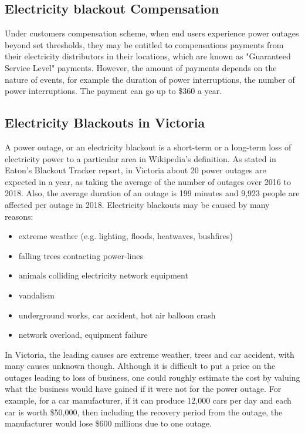\documentclass[12pt]{article}
\begin{document}
\subsection{Electricity blackout Compensation}
\begin{flushleft}
Under customers compensation scheme, when end users experience power outages beyond set thresholds, they may be entitled to compensations payments from their electricity distributors in their locations, which are known as "Guaranteed Service Level" payments. However, the amount of payments depends on the nature of events, for example the duration of power interruptions, the number of power interruptions. The payment can go up to \$360 a year.\parencite{cc} \par 
\end{flushleft}

\subsection{Electricity Blackouts in Victoria}
\begin{flushleft}
A power outage, or an electricity blackout is a short-term or a long-term loss of electricity power to a particular area in Wikipedia's definition. As stated in Eaton's Blackout Tracker report, in Victoria about 20 power outages are expected in a year, as taking the average of the number of outages over 2016 to 2018. Also, the average duration of an outage is 199 minutes and 9,923 people are affected per outage in 2018.\parencite{Eaton} Electricity blackouts may be caused by many reasons:
\begin{itemize}
 \item extreme weather (e.g. lighting, floods, heatwaves, bushfires)
 \item falling trees contacting power-lines
 \item animals colliding electricity network equipment
 \item vandalism
 \item underground works, car accident, hot air balloon crash
 \item network overload, equipment failure\parencite{eb2}\parencite{eb1}
\end{itemize}
In Victoria, the leading causes are extreme weather, trees and car accident, with many causes unknown though.\parencite{Eaton} Although it is difficult to put a price on the outages leading to loss of business, one could roughly estimate the cost by valuing what the business would have gained if it were not for the power outage. For example, for a car manufacturer, if it can produce 12,000 cars per day and each car is worth \$50,000, then including the recovery period from the outage, the manufacturer would lose \$600 millions due to one outage. 
\end{flushleft}
\newpage
\end{document}
